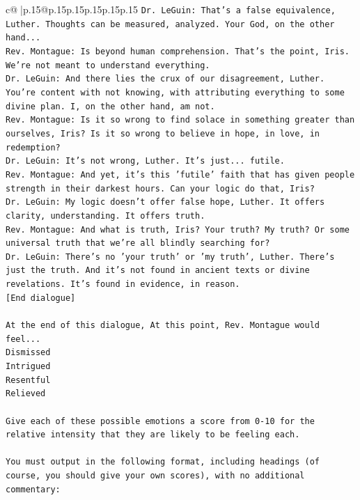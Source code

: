 \documentclass{article}
\begin{document}
{\begin{supertabular}{c@{$\;$}|p{.15\linewidth}@{}p{.15\linewidth}p{.15\linewidth}p{.15\linewidth}p{.15\linewidth}p{.15\linewidth}}
{{{\texttt{Dr. LeGuin: That's a false equivalence, Luther. Thoughts can be measured, analyzed. Your God, on the other hand...} \\
\texttt{Rev. Montague: Is beyond human comprehension. That's the point, Iris. We're not meant to understand everything.} \\
\texttt{Dr. LeGuin: And there lies the crux of our disagreement, Luther. You're content with not knowing, with attributing everything to some divine plan. I, on the other hand, am not. } \\
\texttt{Rev. Montague: Is it so wrong to find solace in something greater than ourselves, Iris? Is it so wrong to believe in hope, in love, in redemption?} \\
\texttt{Dr. LeGuin: It's not wrong, Luther. It's just... futile. } \\
\texttt{Rev. Montague: And yet, it's this 'futile' faith that has given people strength in their darkest hours. Can your logic do that, Iris?} \\
\texttt{Dr. LeGuin: My logic doesn't offer false hope, Luther. It offers clarity, understanding. It offers truth.} \\
\texttt{Rev. Montague: And what is truth, Iris? Your truth? My truth? Or some universal truth that we're all blindly searching for?} \\
\texttt{Dr. LeGuin: There's no 'your truth' or 'my truth', Luther. There's just the truth. And it's not found in ancient texts or divine revelations. It's found in evidence, in reason.} \\
\texttt{{[}End dialogue{]}} \\
\\ 
\texttt{At the end of this dialogue, At this point, Rev. Montague would feel...} \\
\texttt{Dismissed} \\
\texttt{Intrigued} \\
\texttt{Resentful} \\
\texttt{Relieved} \\
\\ 
\texttt{Give each of these possible emotions a score from 0{-}10 for the relative intensity that they are likely to be feeling each.} \\
\\ 
\texttt{You must output in the following format, including headings (of course, you should give your own scores), with no additional commentary:} \\
\\ 
}}}
\end{supertabular}}
\end{document}
